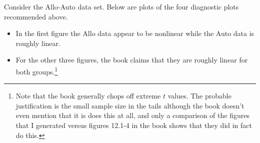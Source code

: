 \documentclass[10pt]{article}\usepackage[]{graphicx}\usepackage[]{xcolor}
\makeatletter
\newenvironment{kframe}{%
 \def\at@end@of@kframe{}%
 \ifinner\ifhmode%
  \def\at@end@of@kframe{\end{minipage}}%
  \begin{minipage}{\columnwidth}%
 \fi\fi%
 \def\FrameCommand##1{\hskip\@totalleftmargin \hskip-\fboxsep
 \colorbox{shadecolor}{##1}\hskip-\fboxsep
     \hskip-\linewidth \hskip-\@totalleftmargin \hskip\columnwidth}%
 \MakeFramed {\advance\hsize-\width
   \@totalleftmargin\z@ \linewidth\hsize
   \@setminipage}}%
 {\par\unskip\endMakeFramed%
 \at@end@of@kframe}
\newenvironment{knitrout}{}{} %
\theoremstyle{definition}
\numberwithin{equation}{subsection}
\numberwithin{figure}{section}
\numberwithin{table}{subsection}
\numberwithin{Report}{section}
\numberwithin{Example}{subsection}
\makeatother
\begin{document}
\noindent Consider the Allo-Auto data set. Below are plots of the
four diagnostic plots recommended above.
\begin{itemize}
	\item In the first figure the Allo data
appear to be nonlinear while the Auto data is roughly linear.
	\item  For the other three figures, the book claims that they are roughly linear
for both groups.\footnote{Note that the book generally chops off extreme $t$ values. The probable
justification is the small sample size in the tails although the book
doesn't even mention that it is does this at all, and only a comparison
of the figures that I generated versus figures 12.1-4 in the book
shows that they did in fact do this.}
\end{itemize}

\newpage



\begin{knitrout}
\color{fgcolor}\begin{kframe}


{\ttfamily\noindent\bfseries\color{errorcolor}{\#\# Error: object 'type' not found}}

{\ttfamily\noindent\bfseries\color{errorcolor}{\#\# Error: object 'type' not found}}

{\ttfamily\noindent\bfseries\color{errorcolor}{\#\# Error: object 'auto\_fit' not found}}

{\ttfamily\noindent\bfseries\color{errorcolor}{\#\# Error in eval(expr, envir, enclos): object 'tb' not found}}

{\ttfamily\noindent\bfseries\color{errorcolor}{\#\# Error in eval(expr, envir, enclos): object 'tb' not found}}

{\ttfamily\noindent\bfseries\color{errorcolor}{\#\# Error in eval(expr, envir, enclos): object 'tb' not found}}

{\ttfamily\noindent\bfseries\color{errorcolor}{\#\# Error in eval(expr, envir, enclos): object 'tb' not found}}

{\ttfamily\noindent\bfseries\color{errorcolor}{\#\# Error in eval(expr, envir, enclos): object 'p1' not found}}\end{kframe}
\end{knitrout}


\newpage
\end{document}
